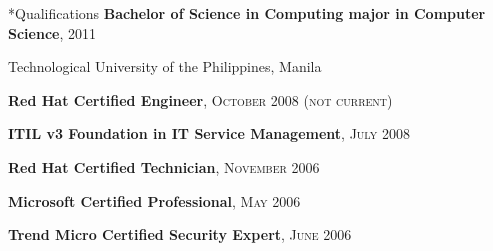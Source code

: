 \documentclass[10pt, a4paper, final]{article}
\begin{document}
\begin{minipage}[t]{0.32\linewidth}
  \begin{section}*{Qualifications}
    \vspace{0.25em}
    \textbf{Bachelor of Science in Computing major in Computer Science}, \textsc{2011}

    Technological University of the Philippines, Manila
    
    \vspace{1em}

    \textbf{Red Hat Certified Engineer}, \textsc{October 2008 (not current)}

    \textbf{ITIL v3 Foundation in IT Service Management}, \textsc{July 2008}

    \textbf{Red Hat Certified Technician}, \textsc{November 2006}

    \textbf{Microsoft Certified Professional}, \textsc{May 2006}

    \textbf{Trend Micro Certified Security Expert}, \textsc{June 2006}


\end{section}
\end{minipage}
\end{document}
